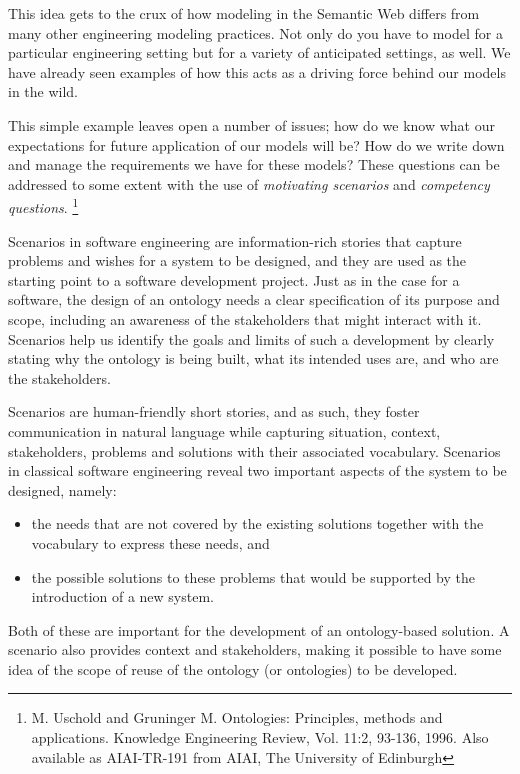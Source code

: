 This idea gets to the crux of how modeling in the Semantic Web differs
from many other engineering
modeling practices. Not only do you have to model for a particular
engineering setting but for a variety of anticipated settings, as well.
We have already seen examples of how this acts as a driving force behind
our models in the wild.

This simple example leaves open a number of issues; how do we know what our expectations 
for future application of our models will be?  How do we write down and manage
the requirements we have for these models?  These questions can be addressed to some 
extent with the use of  \emph{motivating scenarios} and \emph{competency
questions}. %
\footnote{M. Uschold and Gruninger M. Ontologies: Principles, methods and applications. Knowledge Engineering Review, Vol. 11:2, 93-136, 1996. Also available as AIAI-TR-191 from AIAI, The University of Edinburgh}

Scenarios in software engineering are information-rich stories that  capture problems and 
wishes for a system to be designed, and they are used as the starting point to a software 
development project. Just as in the case for a software, the design of an ontology needs 
a clear specification of its purpose and scope, including an awareness of the 
stakeholders that might interact with it. Scenarios help us identify the goals and limits 
of such a development by clearly stating why the ontology is being built, what its 
intended uses are, and who are the stakeholders.

Scenarios are human-friendly short stories, and as such, they foster communication in 
natural language while capturing situation, context, stakeholders, problems and solutions 
with their associated vocabulary.  Scenarios in classical software engineering reveal two 
important aspects of the system to be designed, namely: 

\begin{itemize}
    \item the needs that are not covered by the existing solutions together with the vocabulary to express these needs, and
    \item the possible solutions to these problems that would be supported by the introduction of a new system. 
\end{itemize}

Both of these are important for the development of an ontology-based solution.  A scenario 
also provides context and stakeholders, making it possible to have some idea  of the scope 
of reuse of the ontology (or ontologies) to be developed.  

